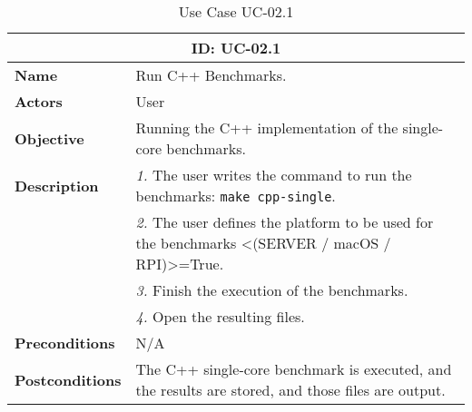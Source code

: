 \begin{table}[H]
    \centering
    \begin{tabular}{l p{10cm}}
        \toprule
        \multicolumn{2}{c}{\textbf{ID: UC-02.1}} \\
        \toprule
        \textbf{Name}                         &  Run C++ Benchmarks. \\
        \textbf{Actors}                       &  User \\
        \textbf{Objective}                    &  Running the C++ implementation of the single-core benchmarks. \\
        \multirow{1}{*}{\textbf{Description}} & \textsl{1.} The user writes the command to run the benchmarks: \texttt{make cpp-single}.\\
                                              & \textsl{2.} The user defines the platform to be used for the benchmarks <(SERVER / macOS / RPI)>=True.\\
                                              & \textsl{3.} Finish the execution of the benchmarks.\\
                                              & \textsl{4.} Open the resulting files.\\ 
        \textbf{Preconditions}                &  N/A \\
        \textbf{Postconditions}               &  The C++ single-core benchmark is executed, and the results are stored, and those files are output. \\
    \end{tabular}
    \caption{Use Case UC-02.1}
    \label{tab:uc-02.1}
\end{table}

